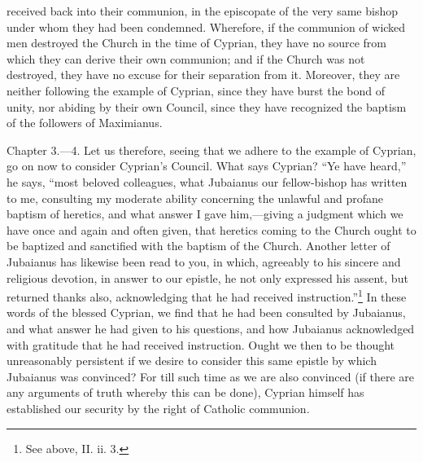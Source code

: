 received back into their communion, in the episcopate of the very same bishop under whom they had been condemned. Wherefore, if the communion of wicked men destroyed the Church in the time of Cyprian, they have no source from which they can derive their own communion; and if the Church was not destroyed, they have no excuse for their separation from it. Moreover, they are neither following the example of Cyprian, since they have burst the bond of unity, nor abiding by their own Council, since they have recognized the baptism of the followers of Maximianus.


Chapter 3.—4. Let us therefore, seeing that we adhere to the example of Cyprian, go on now to consider Cyprian’s Council. What says Cyprian? ``Ye have heard,'' he says, ``most beloved colleagues, what Jubaianus our fellow-bishop has written to me, consulting my moderate ability concerning the unlawful and profane baptism of heretics, and what answer I gave him,—giving a judgment which we have once and again and often given, that heretics coming to the Church ought to be baptized and sanctified with the baptism of the Church. Another letter of Jubaianus has likewise been read to you, in which, agreeably to his sincere and religious devotion, in answer to our epistle, he not only expressed his assent, but returned thanks also, acknowledging that he had received instruction.''\footnote{\par  See above, II. ii. 3.} In these words of the blessed Cyprian, we find that he had been consulted by Jubaianus, and what answer he had given to his questions, and how Jubaianus acknowledged with gratitude that he had received instruction. Ought we then to be thought unreasonably persistent if we desire to consider this same epistle by which Jubaianus was convinced? For till such time as we are also convinced (if there are any arguments of truth whereby this can be done), Cyprian himself has established our security by the right of Catholic communion.

